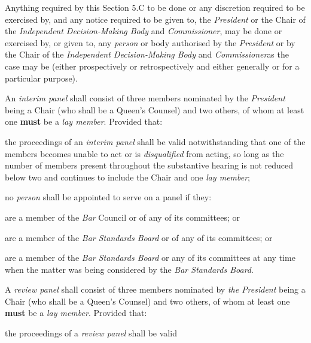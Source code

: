 \par
Anything required by this Section 5.C to be done or any discretion
required to be exercised by, and any notice required to be given to,
the \emph{President} or the Chair of the \emph{Independent
Decision-Making Body }and\emph{ Commissioner}, may be done or exercised
by, or given to, any \emph{person} or body authorised by
the \emph{President} or by the Chair of the \emph{Independent
Decision-Making Body }and\emph{ Commissioner}as the case may be (either
prospectively or retrospectively and either generally or for a
particular purpose).\\
\par
{}
An \emph{interim panel} shall consist of three members nominated by
the \emph{President} being a Chair (who shall be a Queen's Counsel) and
two others, of whom at least one  \textcolor{myred}{\textbf{must}} be a \emph{lay member}. Provided
that:\\\nl \item the proceedings of an \emph{interim panel} shall be valid
notwithstanding that one of the members becomes unable to act or
is \emph{disqualified} from acting, so long as the number of members
present throughout the substantive hearing is not reduced below two and
continues to include the Chair and one \emph{lay member};\item no \emph{person} shall be appointed to serve on a panel if they:\al
\item are a member of the \emph{Bar }Council or of any of its committees;
or\\
\item are a member of the \emph{Bar Standards Board} or of any of its
committees; or\\
\item are a member of the \emph{Bar Standards Board} or any of its
committees at any time when the matter was being considered by
the \emph{Bar Standards Board}.\la\ln
{}\par
A \emph{review panel} shall consist of three members nominated
by \emph{the President} being a Chair (who shall be a Queen's Counsel)
and two others, of whom at least one  \textcolor{myred}{\textbf{must}} be a \emph{lay member}.
Provided that:\\\nl \item the proceedings of a \emph{review panel} shall be valid
